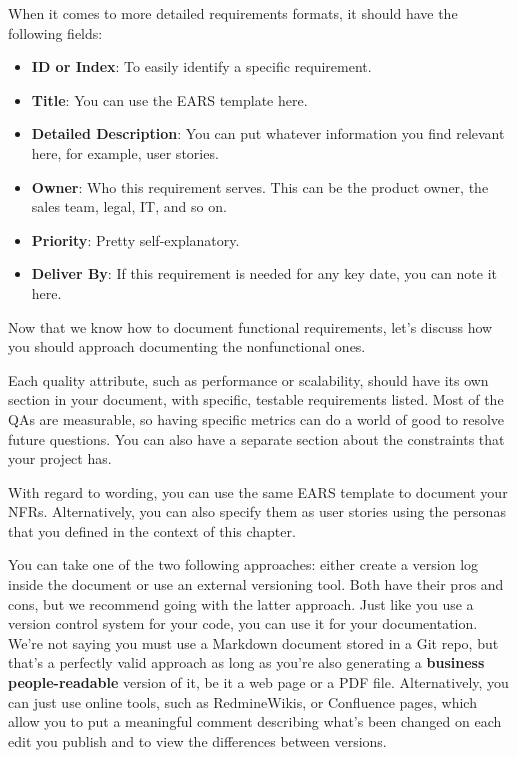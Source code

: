 When it comes to more detailed requirements formats, it should have the following fields:

\begin{itemize}
\item 
\textbf{ID or Index}: To easily identify a specific requirement.

\item 
\textbf{Title}: You can use the EARS template here.

\item 
\textbf{Detailed Description}: You can put whatever information you find relevant here, for example, user stories.

\item
\textbf{Owner}: Who this requirement serves. This can be the product owner, the sales team, legal, IT, and so on.

\item
\textbf{Priority}: Pretty self-explanatory.

\item
\textbf{Deliver By}: If this requirement is needed for any key date, you can note it here. 
\end{itemize}

Now that we know how to document functional requirements, let's discuss how you should approach documenting the nonfunctional ones.



Each quality attribute, such as performance or scalability, should have its own section in your document, with specific, testable requirements listed. Most of the QAs are measurable, so having specific metrics can do a world of good to resolve future questions. You can also have a separate section about the constraints that your project has.

With regard to wording, you can use the same EARS template to document your NFRs. Alternatively, you can also specify them as user stories using the personas that you defined in the context of this chapter.




You can take one of the two following approaches: either create a version log inside the document or use an external versioning tool. Both have their pros and cons, but we recommend going with the latter approach. Just like you use a version control system for your code, you can use it for your documentation. We're not saying you must use a Markdown document stored in a Git repo, but that's a perfectly valid approach as long as you're also generating a \textbf{business people-readable} version of it, be it a web page or a PDF file. Alternatively, you can just use online tools, such as RedmineWikis, or Confluence pages, which allow you to put a meaningful comment describing what's been changed on each edit you publish and to view the differences between versions.

